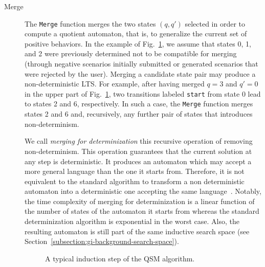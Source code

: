 \begin{description}
\item[Merge] The \texttt{Merge} function merges the two states $(q, q')$ selected in order to compute a quotient automaton, that is, to generalize the current set of positive behaviors. In the example of Fig.~\ref{Fig:algo:steps}, we assume that states 0, 1, and 2 were previously determined not to be compatible for merging (through negative scenarios initially submitted or generated scenarios that were rejected by the user). Merging a candidate state pair may produce a non-deterministic LTS. For example, after having merged $q = 3$ and $q' = 0$ in the upper part of Fig.~\ref{Fig:algo:steps}, two transitions labeled \texttt{start} from state 0 lead to states 2 and 6, respectively. In such a case, the \texttt{Merge} function merges states 2 and 6 and, recursively, any further pair of states that introduces non-determinism. 

We call \textsl{merging for determinization} this recursive operation of removing non-determinism. This operation guarantees that the current solution at any step is deterministic. It produces an automaton which may accept a more general language than the one it starts from. Therefore, it is not equivalent to the standard algorithm to transform a non deterministic automaton into a deterministic one accepting the same language~\cite{Hopcroft:1979}. Notably, the time complexity of merging for determinization is a linear function of the number of states of the automaton it starts from whereas the standard determinization algorithm is exponential in the worst case. Also, the resulting automaton is still part of the same inductive search space (see Section~\ref{subsection:gi-background-search-space}). 

\begin{figure}[H]
\centering
{}
\caption{A typical induction step of the \textsc{QSM} algorithm\label{Fig:algo:steps}.}
\end{figure}


\end{description}
